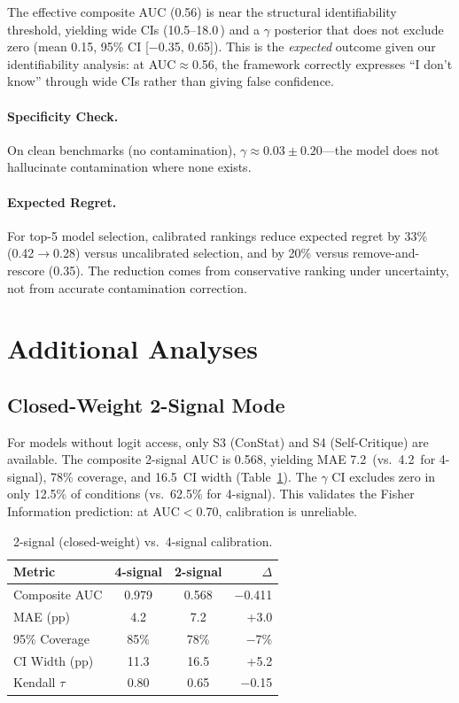 \documentclass[11pt,a4paper]{article}
\newcommand{\pp}{\,\text{pp}}
\begin{document}
The effective composite AUC (0.56) is near the structural identifiability threshold, yielding wide CIs (10.5--18.0\pp{}) and a $\gamma$ posterior that does not exclude zero (mean 0.15, 95\% CI [$-$0.35, 0.65]).
This is the \emph{expected} outcome given our identifiability analysis: at AUC$\approx$0.56, the framework correctly expresses ``I don't know'' through wide CIs rather than giving false confidence.

\paragraph{Specificity Check.}
On clean benchmarks (no contamination), $\gamma \approx 0.03 \pm 0.20$---the model does not hallucinate contamination where none exists.

\paragraph{Expected Regret.}
For top-5 model selection, calibrated rankings reduce expected regret by 33\% (0.42$\to$0.28) versus uncalibrated selection, and by 20\% versus remove-and-rescore (0.35).
The reduction comes from conservative ranking under uncertainty, not from accurate contamination correction.

\section{Additional Analyses}

\subsection{Closed-Weight 2-Signal Mode}

For models without logit access, only S3 (ConStat) and S4 (Self-Critique) are available.
The composite 2-signal AUC is 0.568, yielding MAE 7.2\pp{} (vs.\ 4.2\pp{} for 4-signal), 78\% coverage, and 16.5\pp{} CI width (Table~\ref{tab:2signal}).
The $\gamma$ CI excludes zero in only 12.5\% of conditions (vs.\ 62.5\% for 4-signal).
This validates the Fisher Information prediction: at AUC$<$0.70, calibration is unreliable.

\begin{table}[t]
\centering
\small
\caption{2-signal (closed-weight) vs.\ 4-signal calibration.}
\label{tab:2signal}
\begin{tabular}{@{}l cc r@{}}
\toprule
\textbf{Metric} & \textbf{4-signal} & \textbf{2-signal} & $\Delta$ \\
\midrule
Composite AUC & 0.979 & 0.568 & $-$0.411 \\
MAE (pp) & 4.2 & 7.2 & +3.0 \\
95\% Coverage & 85\% & 78\% & $-$7\% \\
CI Width (pp) & 11.3 & 16.5 & +5.2 \\
Kendall $\tau$ & 0.80 & 0.65 & $-$0.15 \\
\bottomrule
\end{tabular}
\end{table}
\end{document}
